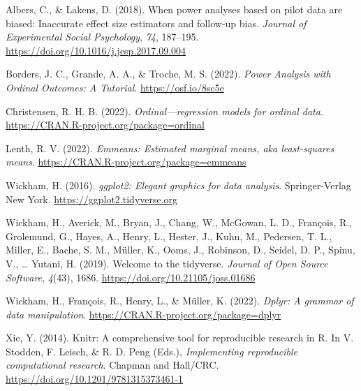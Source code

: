 \documentclass[
  bookmarksnumbered]{article}
\newlength{\cslhangindent}
\newlength{\cslentryspacingunit} %
\newenvironment{CSLReferences}[2] %
 {%
  \setlength{\parindent}{0pt}
  \ifodd #1
  \let\oldpar\par
  \def\par{\hangindent=\cslhangindent\oldpar}
  \fi
  \setlength{\parskip}{#2\cslentryspacingunit}
 }%
 {}
\begin{document}
\hypertarget{refs}{}
\begin{CSLReferences}{1}{0}
\leavevmode{}%
Albers, C., \& Lakens, D. (2018). When power analyses based on pilot data are biased: {Inaccurate} effect size estimators and follow-up bias. \emph{Journal of Experimental Social Psychology}, \emph{74}, 187--195. \url{https://doi.org/10.1016/j.jesp.2017.09.004}

\leavevmode{}%
Borders, J. C., Grande, A. A., \& Troche, M. S. (2022). \emph{Power {Analysis} with {Ordinal Outcomes}: {A Tutorial}}. \url{https://osf.io/8sc5e}

\leavevmode{}%
Christensen, R. H. B. (2022). \emph{Ordinal---regression models for ordinal data}. \url{https://CRAN.R-project.org/package=ordinal}

\leavevmode{}%
Lenth, R. V. (2022). \emph{Emmeans: Estimated marginal means, aka least-squares means}. \url{https://CRAN.R-project.org/package=emmeans}

\leavevmode{}%
Wickham, H. (2016). \emph{ggplot2: Elegant graphics for data analysis}. Springer-Verlag New York. \url{https://ggplot2.tidyverse.org}

\leavevmode{}%
Wickham, H., Averick, M., Bryan, J., Chang, W., McGowan, L. D., François, R., Grolemund, G., Hayes, A., Henry, L., Hester, J., Kuhn, M., Pedersen, T. L., Miller, E., Bache, S. M., Müller, K., Ooms, J., Robinson, D., Seidel, D. P., Spinu, V., \ldots{} Yutani, H. (2019). Welcome to the {tidyverse}. \emph{Journal of Open Source Software}, \emph{4}(43), 1686. \url{https://doi.org/10.21105/joss.01686}

\leavevmode{}%
Wickham, H., François, R., Henry, L., \& Müller, K. (2022). \emph{Dplyr: A grammar of data manipulation}. \url{https://CRAN.R-project.org/package=dplyr}

\leavevmode{}%
Xie, Y. (2014). Knitr: A comprehensive tool for reproducible research in {R}. In V. Stodden, F. Leisch, \& R. D. Peng (Eds.), \emph{Implementing reproducible computational research}. {Chapman and Hall/CRC}. \url{https://doi.org/10.1201/9781315373461-1}

\end{CSLReferences}
\end{document}
